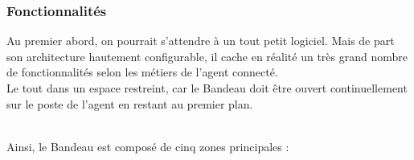 \documentclass{rapport}
\begin{document}
\subsubsection{Fonctionnalités}

\begin{minipage}{0.65\textwidth}
Au premier abord, on pourrait s'attendre à un tout petit logiciel. Mais de part son architecture hautement configurable, il cache en réalité un très grand nombre de fonctionnalités selon les métiers de l'agent connecté.\\

Le tout dans un espace restreint, car le Bandeau doit être ouvert continuellement sur le poste de l'agent en restant au premier plan.  
\end{minipage}
\begin{minipage}{0.25\textwidth}
\raggedright
\end{minipage}
\vspace{10mm} %
\noindent
\\

Ainsi, le Bandeau est composé de cinq zones principales :
\end{document}
